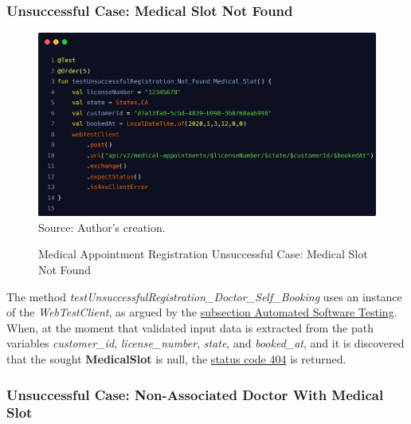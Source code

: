 \subsubsection{Unsuccessful Case: Medical Slot Not Found}

\begin{figure}[H]
	\centering
	\caption{Medical Appointment Registration Unsuccessful Case: Medical Slot Not Found}
	\includegraphics[width=1\linewidth]{figures/medical_appointment_registration_integration_test_unsuccessful_case_medical_slot_not_found.png}
	\label{fig:/medical_appointment_registration_integration_test_unsuccessful_case_medical_slot_not_found}
	\footnotesize Source: Author's creation.
\end{figure}

The method \textit{testUnsuccessfulRegistration\_Doctor\_Self\_Booking} uses an instance of the \textit{WebTestClient}, as argued by the \hyperref[subsection:automated_software_testing]{subsection Automated Software Testing}. When, at the moment that validated input data is extracted from the path variables \textit{customer\_id}, \textit{license\_number}, \textit{state}, and \textit{booked\_at}, and it is discovered that the sought \textbf{MedicalSlot} is null, the \hyperref[tab:summary_http_status_codes]{status code 404} is returned.

\subsubsection{Unsuccessful Case: Non-Associated Doctor With Medical Slot}

